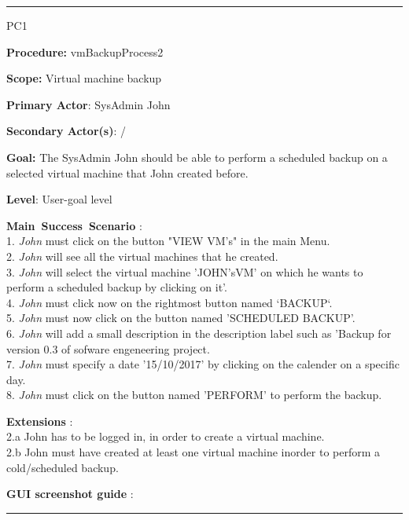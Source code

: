\hrule
\vspace{0.5cm}
\begin{lyxlist}{PC1}
\small{
\item [\textbf{Procedure:}] vmBackupProcess2
\item [\textbf{Scope:}] Virtual machine backup
\item [\textbf{Primary Actor}:] SysAdmin John 
\item [\textbf{Secondary Actor(s)}:] /
\item [\textbf{Goal:}] The SysAdmin John should be able to perform a
scheduled backup on a selected virtual machine that John created before.
\item [\textbf{Level}:] User-goal level
\item [\textbf{Main~Success~Scenario}]:\\
1. \emph{John} must click on the button "VIEW VM's" in the main
Menu.\\
2. \emph{John} will see all the virtual machines that he created.\\
3. \emph{John} will select the virtual machine 'JOHN'sVM' on which he wants
to perform a scheduled backup by clicking on it'.\\
4. \emph{John} must click now on the rightmost button named `BACKUP`.\\
5. \emph{John} must now click on the button named 'SCHEDULED
BACKUP'.\\
6. \emph{John} will add a small description in the description label such as
'Backup for version 0.3 of sofware engeneering project.\\
7. \emph{John} must specify a date '15/10/2017' by clicking on the calender on a
specific day.\\
8. \emph{John} must click on the button named 'PERFORM' to perform the backup.\\



\item [\textbf{Extensions}]:\\
2.a John has to be logged in, in order to create a virtual machine.\\
2.b John must have created at least one virtual machine inorder to perform a
cold/scheduled backup.\\

\item [\textbf{GUI screenshot guide}]:\\
}
\end{lyxlist}
\hrule
\vspace{0.5cm}


